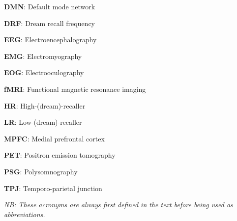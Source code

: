 \label{sec:acronyms}
\vspace*{-10mm}

\begin{multicols}{2}

\textbf{DMN}: Default mode network

\textbf{DRF}: Dream recall frequency

\textbf{EEG}: Electroencephalography

\textbf{EMG}: Electromyography

\textbf{EOG}: Electrooculography

\textbf{fMRI}: Functional magnetic resonance imaging

\textbf{HR}: High-(dream)-recaller

\textbf{LR}: Low-(dream)-recaller

\textbf{MPFC}: Medial prefrontal cortex

\textbf{PET}: Positron emission tomography

\textbf{PSG}: Polysomnography

\textbf{TPJ}: Temporo-parietal junction


\end{multicols}

\textit{NB: These acronyms are always first defined in the text before being used as abbreviations.}
